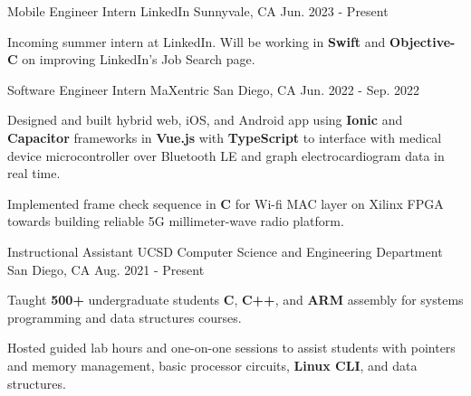 

\begin{cventries}

\cventry
  {Mobile Engineer Intern} %
  {LinkedIn} %
  {Sunnyvale, CA} %
  {Jun. 2023 - Present} %
  {
    \begin{cvitems} %
      \item {Incoming summer intern at LinkedIn. Will be working in \textbf{Swift} and \textbf{Objective-C} on improving LinkedIn's Job Search page. }
    \end{cvitems}
  }


\cventry
  {Software Engineer Intern} %
  {MaXentric} %
  {San Diego, CA} %
  {Jun. 2022 - Sep. 2022} %
  {
    \begin{cvitems} %
      \item {Designed and built hybrid web, iOS, and Android app using \textbf{Ionic} and \textbf{Capacitor} frameworks in \textbf{Vue.js} with \textbf{TypeScript} to interface with medical device microcontroller over Bluetooth LE and graph electrocardiogram data in real time.}
      \item {Implemented frame check sequence in \textbf{C} for Wi-fi MAC layer on Xilinx FPGA towards building reliable 5G millimeter-wave radio platform.}
    \end{cvitems}
  }


\cventry
  {Instructional Assistant} %
  {UCSD Computer Science and Engineering Department} %
  {San Diego, CA} %
  {Aug. 2021 - Present} %
  {
    \begin{cvitems} %
      \item {Taught \textbf{500+} undergraduate students \textbf{C}, \textbf{C++}, and \textbf{ARM} assembly for systems programming and data structures courses.}
      \item {Hosted guided lab hours and one-on-one sessions to assist students with pointers and memory management, basic processor circuits, \textbf{Linux CLI}, and data structures.}
    \end{cvitems}
  }



\end{cventries}
